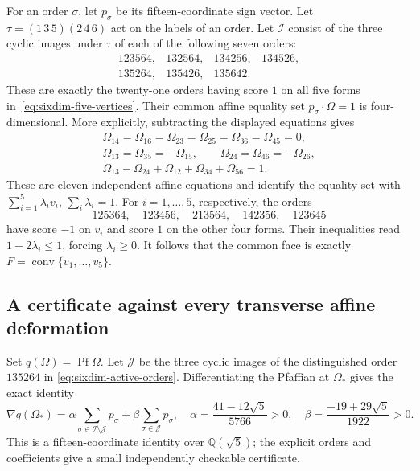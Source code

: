 For an order $\sigma$, let $p_\sigma$ be its fifteen-coordinate sign
vector. Let $\tau=(1\,3\,5)(2\,4\,6)$ act on the labels of an order.
Let $\mathcal I$ consist of the three cyclic images under $\tau$ of each
of the following seven orders:
\begin{equation}\label{eq:sixdim-active-orders}
 \begin{array}{cccc}
 123564,&132564,&134256,&134526,\\
 135264,&135426,&135642.&
 \end{array}
\end{equation}
These are exactly the twenty-one orders having score $1$ on all five
forms in~\eqref{eq:sixdim-five-vertices}. Their common affine equality
set $p_\sigma\cdot\Omega=1$ is four-dimensional. More explicitly,
subtracting the displayed equations gives
\[
 \begin{gathered}
 \Omega_{14}=\Omega_{16}=\Omega_{23}=\Omega_{25}
 =\Omega_{36}=\Omega_{45}=0,\\
 \Omega_{13}=\Omega_{35}=-\Omega_{15},\qquad
 \Omega_{24}=\Omega_{46}=-\Omega_{26},\\
 \Omega_{13}-\Omega_{24}+\Omega_{12}+\Omega_{34}+\Omega_{56}=1.
 \end{gathered}
\]
These are eleven independent affine equations and identify the equality
set with $\sum_{i=1}^5\lambda_i v_i$, $\sum_i\lambda_i=1$.
For $i=1,\ldots,5$, respectively, the orders
\[
 125364,\quad123456,\quad213564,\quad142356,\quad123645
\]
have score $-1$ on $v_i$ and score $1$ on the other four forms. Their
inequalities read $1-2\lambda_i\le1$, forcing $\lambda_i\ge0$.
It follows that the common face is exactly
$F=\operatorname{conv}\{v_1,\ldots,v_5\}$.

\subsection{A certificate against every transverse affine deformation}

Set $q(\Omega)=\operatorname{Pf}\Omega$. Let $\mathcal J$ be the
three cyclic images of the distinguished order $135264$ in
\eqref{eq:sixdim-active-orders}. Differentiating the Pfaffian at
$\Omega_*$ gives the exact identity
\begin{equation}\label{eq:sixdim-gradient-certificate}
 \nabla q(\Omega_*)
 =\alpha\sum_{\sigma\in\mathcal I\setminus\mathcal J}p_\sigma
  +\beta\sum_{\sigma\in\mathcal J}p_\sigma,
 \quad
 \alpha=\frac{41-12\sqrt5}{5766}>0,
 \quad\beta=\frac{-19+29\sqrt5}{1922}>0.
\end{equation}
This is a fifteen-coordinate identity over $\mathbb Q(\sqrt5)$; the
explicit orders and coefficients give a small independently checkable
certificate.

